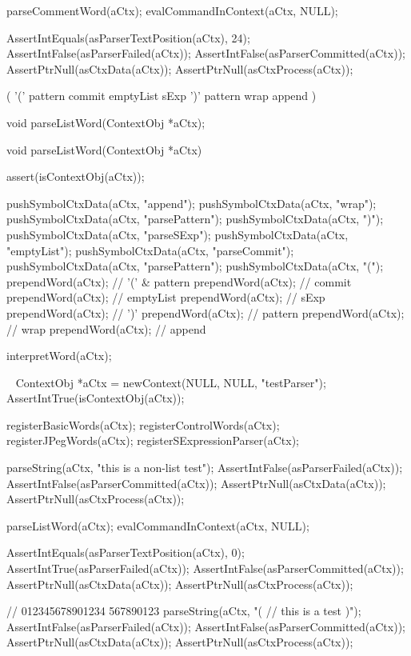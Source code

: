   parseCommentWord(aCtx);
  evalCommandInContext(aCtx, NULL);
  
  AssertIntEquals(asParserTextPosition(aCtx), 24);
  AssertIntFalse(asParserFailed(aCtx));
  AssertIntFalse(asParserCommitted(aCtx));
  AssertPtrNull(asCtxData(aCtx));
  AssertPtrNull(asCtxProcess(aCtx));
\stopCTest
\stopTestCase
\stopTestSuite

\startTestSuite[parseListWord]

\starttyping
(
  '(' pattern commit emptyList
  sExp
  ')' pattern wrap append
)
\stoptyping

\startCHeader
void parseListWord(ContextObj *aCtx);
\stopCHeader

\startCCode
void parseListWord(ContextObj *aCtx) {
  assert(isContextObj(aCtx));
  
  pushSymbolCtxData(aCtx, "append");
  pushSymbolCtxData(aCtx, "wrap");
  pushSymbolCtxData(aCtx, "parsePattern");
  pushSymbolCtxData(aCtx, ")");
  pushSymbolCtxData(aCtx, "parseSExp");
  pushSymbolCtxData(aCtx, "emptyList");
  pushSymbolCtxData(aCtx, "parseCommit");
  pushSymbolCtxData(aCtx, "parsePattern");
  pushSymbolCtxData(aCtx, "(");
  prependWord(aCtx); // '(' & pattern
  prependWord(aCtx); // commit
  prependWord(aCtx); // emptyList
  prependWord(aCtx); // sExp
  prependWord(aCtx); // ')'
  prependWord(aCtx); // pattern
  prependWord(aCtx); // wrap
  prependWord(aCtx); // append
  
  interpretWord(aCtx);
}
\stopCCode

\CTestsSuiteSetup\
\startCTest
  ContextObj *aCtx = newContext(NULL, NULL, "testParser");
  AssertIntTrue(isContextObj(aCtx));
  
  registerBasicWords(aCtx);
  registerControlWords(aCtx);
  registerJPegWords(aCtx);
  registerSExpressionParser(aCtx);
\stopCTest

\startCTest
  parseString(aCtx, "this is a non-list test");
  AssertIntFalse(asParserFailed(aCtx));
  AssertIntFalse(asParserCommitted(aCtx));
  AssertPtrNull(asCtxData(aCtx));
  AssertPtrNull(asCtxProcess(aCtx));
  
  parseListWord(aCtx);
  evalCommandInContext(aCtx, NULL);
  
  AssertIntEquals(asParserTextPosition(aCtx), 0);
  AssertIntTrue(asParserFailed(aCtx));
  AssertIntFalse(asParserCommitted(aCtx));
  AssertPtrNull(asCtxData(aCtx));
  AssertPtrNull(asCtxProcess(aCtx));  
\stopCTest
\stopTestCase

\startCTest
  //                012345678901234 567890123
  parseString(aCtx, "( // this is \n a test )");
  AssertIntFalse(asParserFailed(aCtx));
  AssertIntFalse(asParserCommitted(aCtx));
  AssertPtrNull(asCtxData(aCtx));
  AssertPtrNull(asCtxProcess(aCtx));
  
